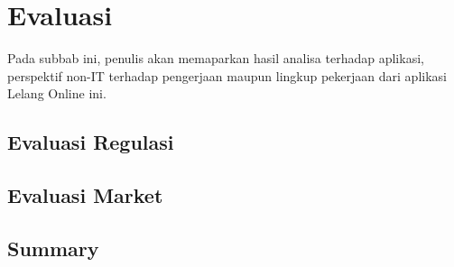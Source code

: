 \section{Evaluasi}
	Pada subbab ini, penulis akan memaparkan hasil analisa terhadap aplikasi, perspektif non-IT terhadap pengerjaan maupun lingkup pekerjaan dari aplikasi Lelang Online ini.
	
	\subsection{Evaluasi Regulasi}
	
	
	\subsection{Evaluasi Market}
	

	\subsection{Summary}